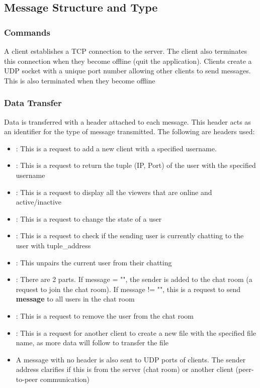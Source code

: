 \documentclass{article}
\begin{document}
\subsection{Message Structure and Type}
\subsubsection{Commands}
A client establishes a TCP connection to the server. The client also terminates this connection when they become offline (quit the application). Clients create a UDP socket with a unique port number allowing other clients to send messages. This is also terminated when they become offline
\subsubsection{Data Transfer}
Data is transferred with a header attached to each message. This header acts as an identifier for the type of message transmitted. The following are headers used: 

\begin{itemize}
    \item {}: This is a request to add a new client with a specified username.
    \item {}: This is a request to return the tuple (IP, Port) of the user with the specified username
    \item {}: This is a request to display all the viewers that are online and active/inactive
    \item {}: This is a request to change the state of a user
    \item {}: This is a request to check if the sending user is currently chatting to the user with tuple\_address
    \item {}: This unpairs the current user from their chatting
    \item {}: There are 2 parts. If message = "", the sender is added to the chat room (a request to join the chat room). If message != "", this is a request to send \textbf{message} to all users in the chat room
    \item {}: This is a request to remove the user from the chat room
    \item {}: This is a request for another client to create a new file with the specified file name, as more data will follow to transfer the file
    \item A message with no header is also sent to UDP ports of clients. The sender address clarifies if this is from the server (chat room) or another client (peer-to-peer communication)
\end{itemize}
\end{document}
